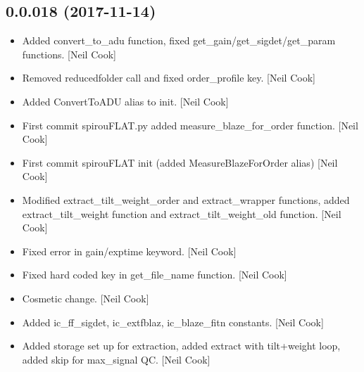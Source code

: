 \documentclass[a4paper,10pt,english]{report}
\begin{document}
\subsection{0.0.018 (2017-11-14)}
\label{\detokenize{misc/changelog:id531}}\begin{itemize}
\item {} 
Added convert\_to\_adu function, fixed get\_gain/get\_sigdet/get\_param
functions. {[}Neil Cook{]}

\item {} 
Removed reducedfolder call and fixed order\_profile key. {[}Neil Cook{]}

\item {} 
Added ConvertToADU alias to init. {[}Neil Cook{]}

\item {} 
First commit spirouFLAT.py added measure\_blaze\_for\_order function.
{[}Neil Cook{]}

\item {} 
First commit spirouFLAT init (added MeasureBlazeForOrder alias) {[}Neil
Cook{]}

\item {} 
Modified extract\_tilt\_weight\_order and extract\_wrapper functions,
added extract\_tilt\_weight function and extract\_tilt\_weight\_old
function. {[}Neil Cook{]}

\item {} 
Fixed error in gain/exptime keyword. {[}Neil Cook{]}

\item {} 
Fixed hard coded key in get\_file\_name function. {[}Neil Cook{]}

\item {} 
Cosmetic change. {[}Neil Cook{]}

\item {} 
Added ic\_ff\_sigdet, ic\_extfblaz, ic\_blaze\_fitn constants. {[}Neil Cook{]}

\item {} 
Added storage set up for extraction, added extract with tilt+weight
loop, added skip for max\_signal QC. {[}Neil Cook{]}

\end{itemize}
\end{document}
